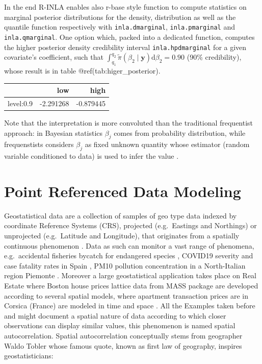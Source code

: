 \documentclass[
  12pt,
  a4paper,
  oneside]{book}
\newcommand{\passthrough}[1]{#1}
\theoremstyle{definition}
\theoremstyle{definition}
\theoremstyle{definition}
\theoremstyle{remark}
\begin{document}
In the end R-INLA enables also r-base style function to compute statistics on marginal posterior distributions for the density, distribution as well as the quantile function respectively with \passthrough{\lstinline!inla.dmarginal!}, \passthrough{\lstinline!inla.pmarginal!} and \passthrough{\lstinline!inla.qmarginal!}. One option which, packed into a dedicated function, computes the higher posterior density credibility interval \passthrough{\lstinline!inla.hpdmarginal!} for a given covariate's coefficient, such that \(\int_{q_{1}}^{q_{2}} \tilde{\pi}\left(\beta_{2} \mid \boldsymbol{y}\right) \mathrm{d} \beta_{2}=0.90\) (90\% credibility), whose result is in table @ref(tab:higer\_posterior).

\begin{tabular}{lrr}
\toprule
  & low & high\\
\midrule
level:0.9 & -2.291268 & -0.879445\\
\bottomrule
\end{tabular}

Note that the interpretation is more convoluted \citeyearpar{wang2018bayesian} than the traditional frequentist approach: in Bayesian statistics \(\beta_{j}\) comes from probability distribution, while frequenstists considers \(\beta_{j}\) as fixed unknown quantity whose estimator (random variable conditioned to data) is used to infer the value \citeyearpar{Blangiardo-Cameletti}.

\hypertarget{prdm}{%
\chapter{Point Referenced Data Modeling}\label{prdm}}

Geostatistical data are a collection of samples of geo type data indexed by coordinate Reference Systems (CRS), projected (e.g.~Eastings and Northings) or unprojected (e.g.~Latitude and Longitude), that originates from a spatially continuous phenomenon \citep{Moraga2019}. Data as such can monitor a vast range of phenomena, e.g.~accidental fisheries bycatch for endangered species \citep{CosandeyGodin2015}, COVID19 severity and case fatality rates in Spain \citep{Moragacovid2020}, PM10 pollution concentration in a North-Italian region Piemonte \citep{Cameletti2012}. Moreover a large geostatistical application takes place on Real Estate where Boston house prices lattice data from MASS \citet{mass} package \citet{rubiorealestate} are developed according to several spatial models, where apartment transaction prices are in Corsica (France) are modeled in time and space \citep{Ling}. All the Examples taken before and might document a spatial nature of data according to which closer observations can display similar values, this phenomenon is named spatial autocorrelation. Spatial autocorrelation conceptually stems from geographer Waldo Tobler whose famous quote, known as first law of geography, inspires geostatisticians:
\end{document}
